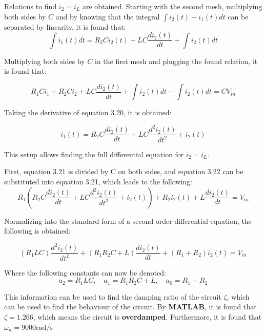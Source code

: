 Relations to find $i_2 = i_L$ are obtained. Starting with the second mesh, multiplying both sides by $C$ and by knowing that the integral $\int{i_2(t) - i_1(t)dt}$ can be separated by linearity, it is found that:
\begin{equation}
    \int{i_1(t)dt} = R_2Ci_2(t) + LC\frac{di_2(t)}{dt} + \int{i_2(t)dt}
\end{equation}

Multiplying both sides by $C$ in the first mesh and plugging the found relation, it is found that:

\begin{equation}
    R_1Ci_1 + R_2Ci_2 + LC\frac{di_2(t)}{dt} + \int{i_2(t)dt} - \int{i_2(t) dt} = CV_{in}
\end{equation}

Taking the derivative of equation 3.20, it is obtained:

\begin{equation}
    i_1(t) = R_2C\frac{di_2(t)}{dt}+LC\frac{d^2i_2(t)}{dt^2}+i_2(t)
\end{equation}

This setup allows finding the full differential equation for $i_2 = i_L$.

First, equation 3.21 is divided by C on both sides, and equation 3.22 can be substituted into equation 3.21, which leads to the following:
\begin{equation}
    R_1\left(R_2C\frac{di_2(t)}{dt}+LC\frac{d^2i_2(t)}{dt^2}+i_2(t)\right) + R_2i_2(t) + L\frac{di_2(t)}{dt} = V_{in}
\end{equation}

Normalizing into the standard form of a second order differential equation, the following is obtained:

\begin{equation}
    (R_1LC)\frac{d^2i_2(t)}{dt^2} + (R_1R_2C+L)\frac{di_2(t)}{dt} + (R_1+R_2)i_2(t) = V_{in}
\end{equation}

Where the following constants can now be denoted:
\begin{equation}
    a_2 = R_1LC, \quad a_1 = R_1R_2C+L, \quad a_0 = R_1+R_2
\end{equation}

This information can be used to find the damping ratio of the circuit $\zeta$, which can be used to find the behaviour of the circuit.
By {\bf MATLAB}, it is found that $\zeta = 1.266$, which means the circuit is {\bf overdamped}. Furthermore, it is found that $\omega_n = 9000\text{rad/s}$

